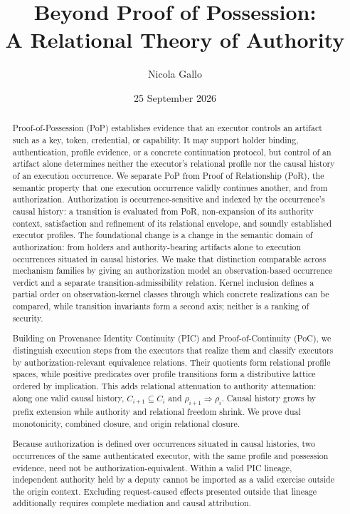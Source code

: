\documentclass[10pt,twocolumn]{article}
\title{Beyond Proof of Possession:\\
A Relational Theory of Authority}
\author{Nicola Gallo}
\date{25 September 2026}
\begin{document}
\maketitle

\begin{abstract}
Proof-of-Possession (PoP) establishes evidence that an executor controls an
artifact such as a key, token, credential, or capability. It may support holder
binding, authentication, profile evidence, or a concrete continuation
protocol, but control of an artifact alone determines neither the executor's
relational profile nor the causal history of an execution occurrence. We
separate PoP from Proof of Relationship (PoR), the semantic property that one
execution occurrence validly continues another, and from authorization.
Authorization is occurrence-sensitive and indexed by the occurrence's causal
history: a transition is evaluated from PoR, non-expansion of its authority
context, satisfaction and refinement of its relational envelope, and soundly
established executor profiles.
The foundational change is a change in the semantic domain of authorization:
from holders and authority-bearing artifacts alone to execution occurrences
situated in causal histories.
We make that distinction comparable across mechanism families by giving an
authorization model an observation-based occurrence verdict and a separate
transition-admissibility relation. Kernel inclusion defines a partial order on
observation-kernel classes through which concrete realizations can be compared,
while transition invariants form a second axis; neither is a ranking of
security.

Building on Provenance Identity Continuity (PIC) and Proof-of-Continuity (PoC),
we distinguish execution steps from the executors that realize them and
classify executors by authorization-relevant equivalence relations. Their
quotients form relational profile spaces, while positive predicates over
profile transitions form a distributive lattice ordered by implication. This
adds relational attenuation to authority attenuation: along one valid causal
history, \(C_{i+1}\subseteq C_i\) and
\(\rho_{i+1}\Rightarrow\rho_i\). Causal history grows by prefix extension
while authority and relational freedom shrink. We prove dual monotonicity,
combined closure, and origin relational closure.

Because authorization is defined over occurrences situated in causal
histories, two occurrences of the same authenticated executor, with the same
profile and possession evidence, need not be authorization-equivalent. Within
a valid PIC lineage, independent authority held by a deputy cannot be imported
as a valid exercise outside the origin context. Excluding request-caused
effects presented outside that lineage additionally requires complete
mediation and causal attribution.


\end{abstract}
\end{document}
